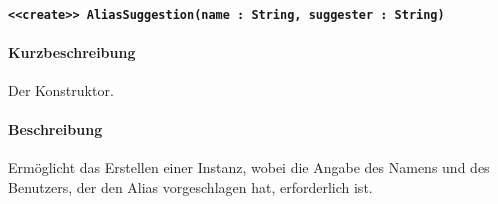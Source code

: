 \paragraph*{\texttt{<<create>> AliasSuggestion(name : String, suggester : String)}}%
\paragraph*{Kurzbeschreibung}
Der Konstruktor.
\paragraph*{Beschreibung}
Ermöglicht das Erstellen einer Instanz, wobei die Angabe des Namens und des Benutzers, der den Alias vorgeschlagen hat, erforderlich ist.
